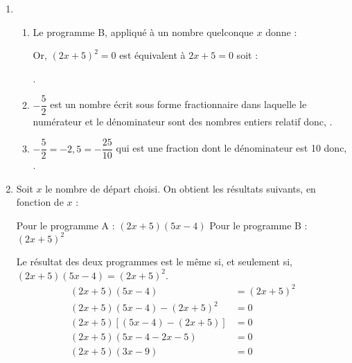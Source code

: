 \begin{enumerate}
\begin{enumerate}
       \end{enumerate}
    \item
       \begin{enumerate}
          \item Le programme B, appliqué à un nombre quelconque $x$ donne : \par \smallskip
              \par
             Or, $(2x+5)^2 =0$ est équivalent à $2x+5 =0$ soit : \vskip-8mm
              \par
             .
          \item $-\dfrac52$ est un nombre écrit sous forme fractionnaire dans laquelle le numérateur et le dénominateur sont des nombres entiers relatif donc, . \par
          \item $-\dfrac52 =-2,5 =-\dfrac{25}{10}$ qui est une fraction dont le dénominateur est 10 donc, .
       \end{enumerate}
    \item Soit $x$ le nombre de départ choisi. On obtient les résultats suivants, en fonction de $x$ : \par
       Pour le programme A : $(2x+5)(5x-4)$ \qquad Pour le programme B : $(2x+5)^2$ \par
       Le résultat des deux programmes est le même si, et seulement si, $(2x+5)(5x-4) =(2x+5)^2$.
       \begin{align*}
          (2x+5)(5x-4) & = (2x+5)^2 \\
          (2x+5)(5x-4)-(2x+5)^2 & = 0 \\
          (2x+5)[(5x-4)-(2x+5)] & = 0 \\
          (2x+5)(5x-4-2x-5) & = 0 \\
          (2x+5)(3x-9) & = 0
       \end{align*}
 \end{enumerate}